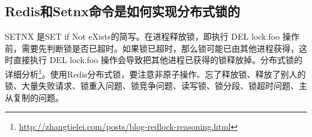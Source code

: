 \documentclass[../../../interview-questions.tex]{subfiles}
\begin{document}
\subsection{Redis和Setnx命令是如何实现分布式锁的}

SETNX 是SET if Not eXists的简写。在进程释放锁，即执行 DEL lock.foo 操作前，需要先判断锁是否已超时。如果锁已超时，那么锁可能已由其他进程获得，这时直接执行 DEL lock.foo 操作会导致把其他进程已获得的锁释放掉。分布式锁的详细分析\footnote{\url{http://zhangtielei.com/posts/blog-redlock-reasoning.html}}。使用Redis分布式锁，要注意非原子操作、忘了释放锁、释放了别人的锁、大量失败请求、锁重入问题、锁竞争问题、读写锁、锁分段、锁超时问题、主从复制的问题。
\end{document}
